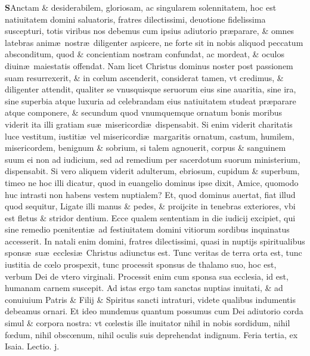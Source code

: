 \documentclass[a5paper,10pt]{book}
\def\ae{æ}
\def\oe{œ}
\begin{document}
\begin{multicols*}{2}
\vspace{-1.5em}
\lettrine[lines=2]{\bfseries \color{red} S}{}Anctam \& desiderabilem, gloriosam, ac singularem solennitatem, hoc est natiuitatem domini saluatoris, fratres dilectissimi, deuotione fidelissima suscepturi, totis viribus nos debemus cum ipsius adiutorio pr\ae parare, \& omnes latebras anim\ae \ nostr\ae \ diligenter aspicere, ne forte sit in nobis aliquod peccatum absconditum, quod \& concientiam nostram confundat, ac mordeat, \& oculos diuin\ae \ maiestatis offendat.
Nam licet Christus dominus noster post passionem suam resurrexerit, \& in c\oe lum ascenderit, considerat tamen, vt credimus, \& diligenter attendit, qualiter se vnusquisque seruorum eius sine auaritia, sine ira, sine superbia atque luxuria ad celebrandam eius natiuitatem studeat pr\ae parare atque componere, \& secundum quod vnumquemque ornatum bonis moribus viderit ita illi gratiam su\ae \ misericordi\ae \ dispensabit.
Si enim viderit charitatis luce vestitum, iustiti\ae \ vel misericordi\ae \ margaritis ornatum, castum, humilem, misericordem, benignum \& sobrium, si talem agnouerit, corpus \& sanguinem suum ei non ad iudicium, sed ad remedium per sacerdotum suorum ministerium, dispensabit.
Si vero aliquem viderit adulterum, ebriosum, cupidum \& superbum, timeo ne hoc illi dicatur, quod in euangelio dominus ipse dixit, Amice, quomodo huc intrasti non habens vestem nuptialem?
Et, quod dominus auertat, fiat illud quod sequitur, Ligate illi manus \& pedes, \& proijcite in tenebras exteriores, vbi est fletus \& stridor dentium.
Ecce qualem sententiam in die iudicij excipiet, qui sine remedio p\oe nitenti\ae \ ad festiuitatem domini vitiorum sordibus inquinatus accesserit.
In natali enim domini, fratres dilectissimi, quasi in nuptijs spiritualibus spons\ae \ su\ae \ ecclesi\ae \ Christus adiunctus est.
Tunc veritas de terra orta est, tunc iustitia de c\oe lo prospexit, tunc processit sponsus de thalamo suo, hoc est, verbum Dei de vtero virginali.
Processit enim cum sponsa sua ecclesia, id est, humanam carnem suscepit.
Ad istas ergo tam sanctas nuptias inuitati, \& ad conuiuium Patris \& Filij \& Spiritus sancti intraturi, videte qualibus indumentis debeamus ornari.
Et ideo mundemus quantum possumus cum Dei adiutorio corda simul \& corpora nostra: vt c\oe lestis ille inuitator nihil in nobis sordidum, nihil f\oe dum, nihil obsc\oe num, nihil oculis suis deprehendat indignum.
\newline {} \color{red} \hypertarget{TUE-PRIMA-ADV}{Feria tertia,} ex Isaia. \hfill Lectio. j. \color{black}

\end{multicols*}
\end{document}
